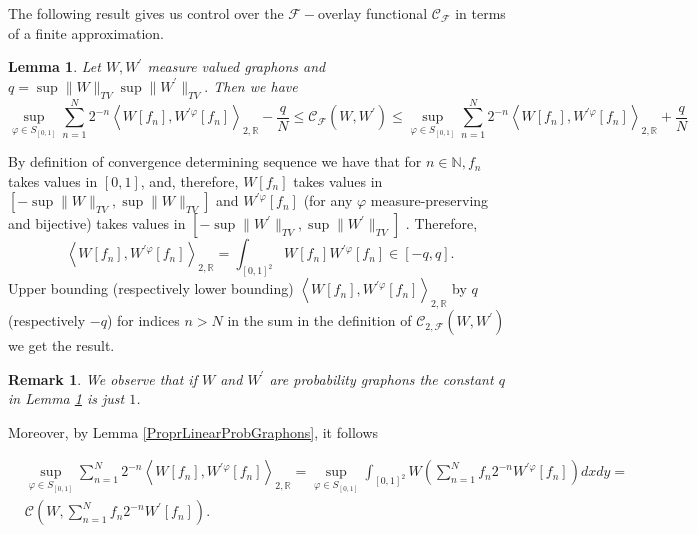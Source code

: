 \documentclass[11pt]{article}
\newtheorem{lemma}[theorem]{Lemma}
\newtheorem{remark}[theorem]{Remark}
\def\R{\mathbb{R}}
\newcommand{\cC}{{\mathcal C}}  %
\newcommand{\cF}{{\mathcal F}}  %
\begin{document}
The following result gives us control over the $\cF-$overlay functional $\cC_{\cF}$ in terms of a finite approximation.

\begin{lemma}\label{boundOverlayFunctionsApproxFinite}
 Let $W,W^{\prime}$ measure valued graphons and $q=\sup\|W\|_{TV}\sup\|W^{\prime}\|_{TV}.$ Then we have 
 $$ \sup _{\varphi \in S_{[0,1]}}\sum^{N}_{n=1}2^{-n}\left\langle W[f_n], W^{\prime \varphi}[f_n]\right\rangle_{2,\R}-\frac{q}{N}\leq   \mathcal{C}_{\mathcal{F}}\left(W, W^{\prime}\right)   \leq  \sup _{\varphi \in S_{[0,1]}}\sum^{N}_{n=1}2^{-n}\left\langle W[f_n], W^{\prime \varphi}[f_n]\right\rangle_{2,\R}+\frac{q}{N}$$
\end{lemma}

\proof
By definition of convergence determining sequence we have that for $n \in \mathbb{N}, f_n$ takes values in $[0,1]$, and, therefore, $W[f_n]$ takes values in $[-\sup\|W\|_{TV},\sup\|W\|_{TV}]$ and $W^{\prime \varphi}[f_n]
$ (for any $\varphi$ measure-preserving and bijective) takes values in $[-\sup\|W^{\prime}\|_{TV},\sup\|W^{\prime}\|_{TV}]$ .%
Therefore, $$\left\langle W[f_n], W^{\prime \varphi}[f_n]\right\rangle_{2,\R}=\int_{[0,1]^2} W[f_n] W^{\prime \varphi}[f_n]\in [-q,q].
$$
Upper bounding (respectively lower bounding) $\left\langle W[f_n], W^{\prime \varphi}[f_n]\right\rangle_{2,\R}$ by $q$ (respectively $-q$) for indices $n>N$ in the sum in the definition of $\mathcal{C}_{2,\mathcal{F}}\left(W, W^{\prime}\right) $ we get the result.

\endproof
\begin{remark}
We observe that if $W$ and $W^{\prime}$ are probability graphons the constant $q$ in Lemma \ref{boundOverlayFunctionsApproxFinite} is just $1$.   
\end{remark}

Moreover, by Lemma \ref{ProprLinearProbGraphons}, it follows

\begin{equation}
\begin{aligned}\label{identityFOverlay}
& \sup _{\varphi \in S_{[0,1]}}\sum^{N}_{n=1}2^{-n}\left\langle W[f_n], W^{\prime \varphi}[f_n]\right\rangle_{2,\R}= \sup _{\varphi \in S_{[0,1]}}\int_{[0,1]^2} W(\sum^{N}_{n=1} f_n 2^{-n}W^{\prime \varphi}[f_n])d x d y=\\
&\mathcal{C}(W,\sum^{N}_{n=1} f_n 2^{-n}W^{\prime}[f_n]).
 \end{aligned}
\end{equation}
\end{document}
